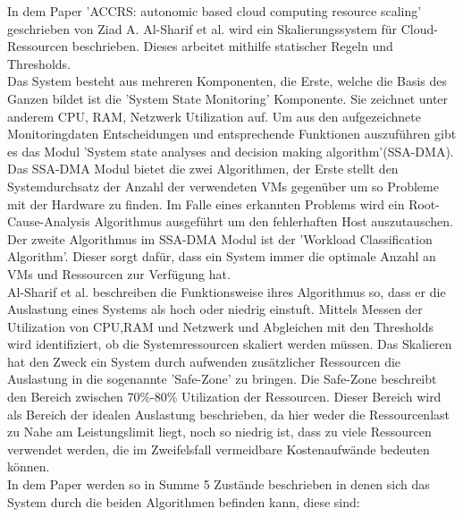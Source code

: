 \documentclass[a4paper,10pt]{scrartcl}
\begin{document}
In dem Paper 'ACCRS: autonomic based cloud computing resource scaling' geschrieben von Ziad A. Al-Sharif et al. wird ein Skalierungssystem für Cloud-Ressourcen beschrieben. Dieses arbeitet mithilfe statischer Regeln und Thresholds.\\
Das System besteht aus mehreren Komponenten, die Erste, welche die Basis des Ganzen bildet ist die 'System State Monitoring' Komponente. Sie zeichnet unter anderem CPU, RAM, Netzwerk Utilization auf. Um aus den aufgezeichnete Monitoringdaten Entscheidungen und entsprechende Funktionen auszuführen gibt es das Modul 'System state analyses and decision making algorithm'(SSA-DMA). Das SSA-DMA Modul bietet die zwei Algorithmen, der Erste stellt den Systemdurchsatz der Anzahl der verwendeten VMs gegenüber um so Probleme mit der Hardware zu finden. Im Falle eines erkannten Problems wird ein Root-Cause-Analysis Algorithmus ausgeführt um den fehlerhaften Host auszutauschen.\\
Der zweite Algorithmus im SSA-DMA Modul ist der 'Workload Classification Algorithm'.
Dieser sorgt dafür, dass ein System immer die optimale Anzahl an VMs und Ressourcen zur Verfügung hat.\\
Al-Sharif et al. beschreiben die Funktionsweise ihres Algorithmus so, dass er die Auslastung eines Systems als hoch oder niedrig einstuft. Mittels Messen der Utilization von CPU,RAM und Netzwerk und Abgleichen mit den Thresholds wird identifiziert, ob die Systemressourcen skaliert werden müssen. Das Skalieren hat den Zweck ein System durch aufwenden zusätzlicher Ressourcen die Auslastung in die sogenannte 'Safe-Zone' zu bringen. Die Safe-Zone beschreibt den Bereich zwischen 70\%-80\% Utilization der Ressourcen. Dieser Bereich wird als Bereich der idealen Auslastung beschrieben, da hier weder die Ressourcenlast zu Nahe am Leistungslimit liegt, noch so niedrig ist, dass zu viele Ressourcen verwendet werden, die im Zweifelsfall vermeidbare Kostenaufwände bedeuten können.\\
In dem Paper werden so in Summe 5 Zustände beschrieben in denen sich das System durch die beiden Algorithmen befinden kann, diese sind:
\end{document}
